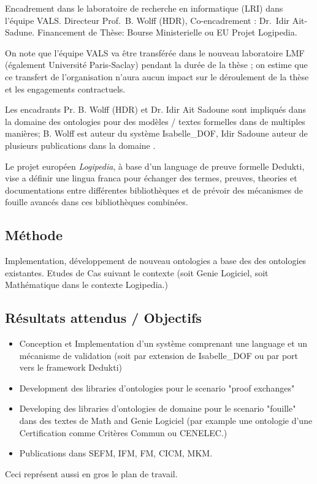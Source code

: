 \documentclass[a4paper,10pt]{article}
\begin{document}
Encadrement dans le laboratoire de recherche en informatique (LRI)
dans l'équipe VALS\@.
Directeur Prof.\ B. Wolff (HDR), Co-encadrement : Dr.\ Idir Ait-Sadune.
Financement de Thèse: Bourse Ministerielle ou EU Projet Logipedia.

On note que l'équipe VALS va être transférée
dans le nouveau laboratoire LMF (également Université Paris-Saclay)
pendant la durée de la thèse ;
on estime que ce transfert de l'organisation n'aura aucun impact
sur le déroulement de la thèse et les engagements contractuels.

Les encadrants Pr. B. Wolff (HDR) et Dr. Idir Ait Sadoune sont impliqués
dans la domaine des ontologies pour des modèles / textes formelles
dans de multiples manières;
B. Wolff est auteur du système Isabelle\_DOF,
Idir Sadoune auteur de plusieurs publications dans la domaine
\cite{DBLP:conf/medi/Ait-SadouneM19}.

Le projet européen \emph{Logipedia},
à base d'un language de preuve formelle Dedukti\cite{dedukti}, vise
a définir une lingua franca
pour échanger des termes, preuves, theories et documentations
entre différentes bibliothèques
et de prévoir des mécanismes de fouille avancés
dans ces bibliothèques combinées.

\subsection*{Méthode}

Implementation, développement de nouveau ontologies
a base des des ontologies existantes.
Etudes de Cas suivant le contexte
(soit Genie Logiciel, soit Mathématique dans le contexte Logipedia.)

\subsection*{Résultats attendus / Objectifs}

\begin{itemize}
  \item
    Conception et Implementation d'un système comprenant
    une language et un mécanisme de validation
    (soit par extension de Isabelle\_DOF ou par port vers le framework Dedukti)
  \item
    Development des libraries d'ontologies pour le scenario "proof exchanges"
  \item
    Developing des libraries d'ontologies de domaine
    pour le scenario "fouille"  dans des textes de Math and Genie Logiciel
    (par example une ontologie
    d'une Certification comme Critères Commun ou CENELEC.)
  \item
    Publications dans SEFM, IFM, FM, CICM, MKM.
\end{itemize}

Ceci représent aussi en gros le plan de travail.



\end{document}

